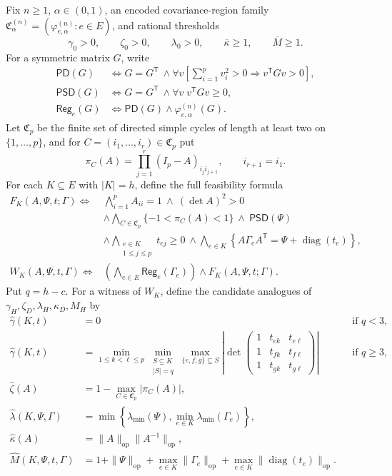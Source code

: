 Fix \(n\geq1\), \(\alpha\in(0,1)\), an encoded covariance-region family \(\mathfrak C^{(n)}_\alpha=(\varphi^{(n)}_{e,\alpha}:e\in E)\), and rational thresholds
\[
 \gamma_0>0,
 \qquad \zeta_0>0,
 \qquad \lambda_0>0,
 \qquad \overline\kappa\geq1,
 \qquad \overline M\geq1.
\]
For a symmetric matrix \(G\), write
\[
 \begin{aligned}
 \mathsf{PD}(G)
 &\Longleftrightarrow
 G=G^{\mathsf T}\ \wedge
 \forall v\left[
   \sum_{i=1}^p v_i^2>0
   \Rightarrow v^{\mathsf T}Gv>0
 \right],\\
 \mathsf{PSD}(G)
 &\Longleftrightarrow
 G=G^{\mathsf T}\ \wedge
 \forall v\;v^{\mathsf T}Gv\geq0,\\
 \mathsf{Reg}_e(G)
 &\Longleftrightarrow
 \mathsf{PD}(G)\wedge\varphi^{(n)}_{e,\alpha}(G).
 \end{aligned}
\]
Let \(\mathfrak C_p\) be the finite set of directed simple cycles of length at least two on \(\{1,\ldots,p\}\), and for \(C=(i_1,\ldots,i_r)\in\mathfrak C_p\) put
\[
 \pi_C(A)=\prod_{j=1}^r (I_p-A)_{i_j i_{j+1}},
 \qquad i_{r+1}=i_1.
\]
For each \(K\subseteq E\) with \(|K|=h\), define the full feasibility formula
\[
\begin{aligned}
 F_K(A,\Psi,t;\Gamma)\Longleftrightarrow{}&
 \bigwedge_{i=1}^p A_{ii}=1
 \ \wedge\ (\det A)^2>0\\
 &\wedge\bigwedge_{C\in\mathfrak C_p}
   \{-1<\pi_C(A)<1\}
 \ \wedge\ \mathsf{PSD}(\Psi)\\
 &\wedge\bigwedge_{\substack{e\in K\\1\leq j\leq p}}t_{ej}\geq0
 \ \wedge\bigwedge_{e\in K}
 \left\{A\Gamma_eA^{\mathsf T}
 =\Psi+\operatorname{diag}(t_e)\right\},\\
 W_K(A,\Psi,t,\Gamma)\Longleftrightarrow{}&
 \left(\bigwedge_{e\in E}\mathsf{Reg}_e(\Gamma_e)\right)
 \wedge F_K(A,\Psi,t;\Gamma).
\end{aligned}
\]
Put \(q=h-c\).  For a witness of \(W_K\), define the candidate analogues of \(\gamma_H,\zeta_D,\lambda_H,\kappa_D,M_H\) by
\[
\begin{aligned}
 \widehat\gamma(K,t)
 &=0 &&\text{if }q<3,\\
 \widehat\gamma(K,t)
 &=\min_{1\leq k<\ell\leq p}
   \min_{\substack{S\subseteq K\\|S|=q}}
   \max_{\{e,f,g\}\subseteq S}
   \left|\det
   \begin{pmatrix}
    1&t_{ek}&t_{e\ell}\\
    1&t_{fk}&t_{f\ell}\\
    1&t_{gk}&t_{g\ell}
   \end{pmatrix}\right| &&\text{if }q\geq3,\\
 \widehat\zeta(A)
 &=1-\max_{C\in\mathfrak C_p}|\pi_C(A)|,\\
 \widehat\lambda(K,\Psi,\Gamma)
 &=\min\left\{\lambda_{\min}(\Psi),
       \min_{e\in K}\lambda_{\min}(\Gamma_e)\right\},\\
 \widehat\kappa(A)
 &=\|A\|_{\mathrm{op}}\|A^{-1}\|_{\mathrm{op}},\\
 \widehat M(K,\Psi,t,\Gamma)
 &=1+\|\Psi\|_{\mathrm{op}}
   +\max_{e\in K}\|\Gamma_e\|_{\mathrm{op}}
   +\max_{e\in K}\|\operatorname{diag}(t_e)\|_{\mathrm{op}}.
\end{aligned}
\]
